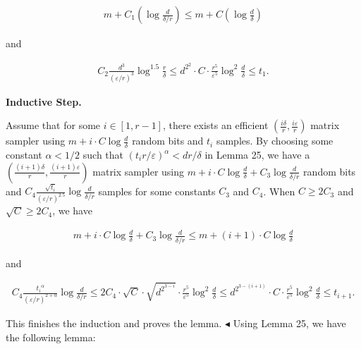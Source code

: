 \documentclass[10pt,a4paper]{article}
\begin{document}
\[\begin{gathered}
m+C_{1}\left(\log\frac{d}{\delta/r}\right)\leq m+C\left(\log\frac{d}{\delta}\right)
\end{gathered}\]


and\par


\[\begin{gathered}
C_{2}\frac{d^{3}}{(\varepsilon/r)^{3}}\log^{1.5}\frac{r}{\delta}\leq d^{2^{2}}\cdot C\cdot\frac{r^{5}}{\varepsilon^{5}}\log^{2}\frac{d}{\delta}\leq t_{1}.
\end{gathered}\]





\par\medskip\noindent\textbf{Inductive Step.}\par




Assume that for some $i\in[1,r-1]$, there exists an efficient $\left(\frac{i\delta}{r},\frac{i\varepsilon}{r}\right)$ matrix sampler using $m+i\cdot C\log\frac{d}{\delta}$ random bits and $t_{i}$ samples.
By choosing some constant $\alpha<1/2$ such that $(t_{i}r/\varepsilon)^{\alpha}<dr/\delta$ in Lemma 25, we have a $\left(\frac{(i+1)\delta}{r},\frac{(i+1)\varepsilon}{r}\right)$ matrix sampler using $m+i\cdot C\log\frac{d}{\delta}+C_{3}\log\frac{d}{\delta/r}$ random bits and $C_{4}\frac{\sqrt{t_{i}}}{(\varepsilon/r)^{2.5}}\log\frac{d}{\delta/r}$ samples for some constants $C_{3}$ and $C_{4}$. When $C\geq 2C_{3}$ and $\sqrt{C}\geq 2C_{4}$, we have\par


\[\begin{gathered}
m+i\cdot C\log\frac{d}{\delta}+C_{3}\log\frac{d}{\delta/r}\leq m+(i+1)\cdot C\log\frac{d}{\delta}
\end{gathered}\]


and\par


\[\begin{gathered}
C_{4}\frac{{t_{i}}^{\alpha}}{(\varepsilon/r)^{2+\alpha}}\log\frac{d}{\delta/r}\leq 2C_{4}\cdot\sqrt{C}\cdot\sqrt{d^{2^{3-i}}}\cdot\frac{r^{5}}{\varepsilon^{5}}\log^{2}\frac{d}{\delta}\leq d^{2^{3-(i+1)}}\cdot C\cdot\frac{r^{5}}{\varepsilon^{5}}\log^{2}\frac{d}{\delta}\leq t_{i+1}.
\end{gathered}\]


This finishes the induction and proves the lemma.
$\blacktriangleleft$
Using Lemma 25, we have the following lemma:\par
\end{document}
